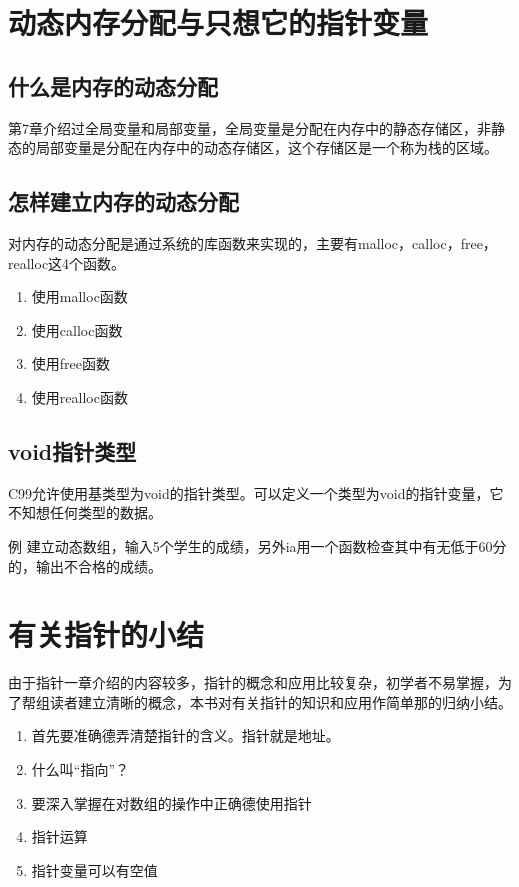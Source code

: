 \section{动态内存分配与只想它的指针变量}
\subsection{什么是内存的动态分配}
第7章介绍过全局变量和局部变量，全局变量是分配在内存中的静态存储区，非静态的局部变量是分配在内存中的动态存储区，这个存储区是一个称为栈的区域。
\subsection{怎样建立内存的动态分配}
对内存的动态分配是通过系统的库函数来实现的，主要有malloc，calloc，free，realloc这4个函数。
\begin{enumerate}
	\item 使用malloc函数
	\item 使用calloc函数
	\item 使用free函数
	\item 使用realloc函数
\end{enumerate}
\subsection{void指针类型}
C99允许使用基类型为void的指针类型。可以定义一个类型为void的指针变量，它不知想任何类型的数据。

例 建立动态数组，输入5个学生的成绩，另外ia用一个函数检查其中有无低于60分的，输出不合格的成绩。
\section{有关指针的小结}
由于指针一章介绍的内容较多，指针的概念和应用比较复杂，初学者不易掌握，为了帮组读者建立清晰的概念，本书对有关指针的知识和应用作简单那的归纳小结。
\begin{enumerate}
	\item 首先要准确德弄清楚指针的含义。指针就是地址。
	\item 什么叫“指向”？
	\item 要深入掌握在对数组的操作中正确德使用指针
	\item 指针运算
	\item 指针变量可以有空值
\end{enumerate}
